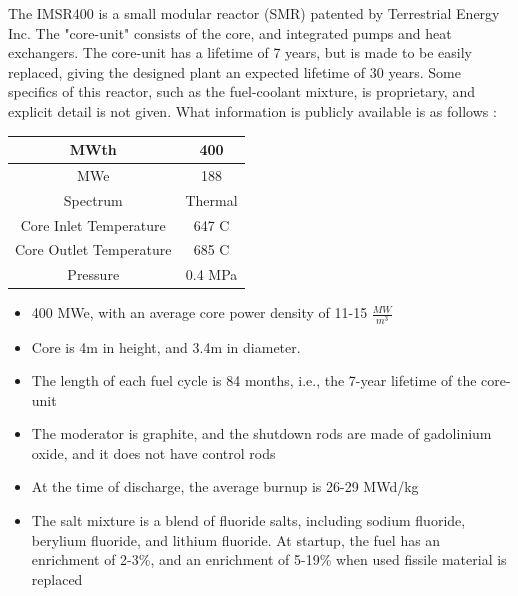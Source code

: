 \documentclass[letterpaper]{article}
\begin{document}
The IMSR400 is a small modular reactor (SMR) patented by Terrestrial Energy Inc.  The "core-unit" consists of the core, and integrated pumps and heat exchangers.  The core-unit has a lifetime of 7 years, but is made to be easily replaced, giving the designed plant an expected lifetime of 30 years.  Some specifics of this reactor, such as the fuel-coolant mixture, is proprietary, and explicit detail is not given.  What information is publicly available is as follows \cite{leblanc_18_2017}:

\begin{center}
\begin{tabular}{|c|c|}
\hline
MWth & 400 \\
\hline
MWe & 188 \\
\hline
Spectrum & Thermal \\
\hline
Core Inlet Temperature & 647 C \\
\hline
Core Outlet Temperature & 685 C\\
\hline
Pressure & 0.4 MPa \\
\hline
\end{tabular}
\end{center}

\begin{itemize}
\item 400 MWe, with an average core power density of 11-15 $\frac{MW}{m^{3}}$
\item Core is 4m in height, and 3.4m in diameter.
\item The length of each fuel cycle is 84 months, i.e., the 7-year lifetime of the core-unit
\item The moderator is graphite, and the shutdown rods are made of gadolinium oxide, and it does not have control rods
\item At the time of discharge, the average burnup is 26-29 MWd/kg
\item The salt mixture is a blend of fluoride salts, including sodium fluoride, berylium fluoride, and lithium fluoride.  At startup, the fuel has an enrichment of 2-3\%, and an enrichment of 5-19\% when used fissile material is replaced
\end{itemize}
\end{document}
